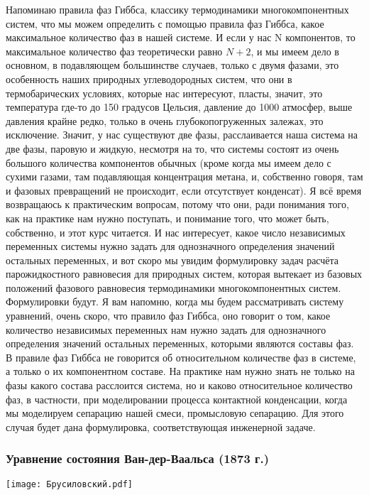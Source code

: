 \documentclass[main.tex]{subfiles}
\begin{document}
Напоминаю правила фаз Гиббса, классику термодинамики многокомпонентных систем, что мы можем определить с помощью правила фаз Гиббса, какое максимальное количество фаз в нашей системе.
И если у нас N компонентов, то максимальное количество фаз теоретически равно $N+2$, и мы имеем дело в основном, в подавляющем большинстве случаев, только с двумя фазами, это особенность наших природных углеводородных систем, что они в термобарических условиях, которые нас интересуют, пласты, значит, это температура где-то до 150 градусов Цельсия, давление до 1000 атмосфер, выше давления крайне редко, только в очень глубокопогруженных залежах, это исключение.
Значит, у нас существуют две фазы, расслаивается наша система на две фазы, паровую и жидкую, несмотря на то, что системы состоят из очень большого количества компонентов обычных (кроме когда мы имеем дело с сухими газами, там подавляющая концентрация метана, и, собственно говоря, там и фазовых превращений не происходит, если отсутствует конденсат).
Я всё время возвращаюсь к практическим вопросам, потому что они, ради понимания того, как на практике нам нужно поступать, и понимание того, что может быть, собственно, и этот курс читается.
И нас интересует, какое число независимых переменных системы нужно задать для однозначного определения значений остальных переменных, и вот скоро мы увидим формулировку задач расчёта парожидкостного равновесия для природных систем, которая вытекает из базовых положений фазового равновесия термодинамики многокомпонентных систем.
Формулировки будут.
Я вам напомню, когда мы будем рассматривать систему уравнений, очень скоро, что правило фаз Гиббса, оно говорит о том, какое количество независимых переменных нам нужно задать для однозначного определения значений остальных переменных, которыми являются составы фаз.
В правиле фаз Гиббса не говорится об относительном количестве фаз в системе, а только о их компонентном составе.
На практике нам нужно знать не только на фазы какого состава расслоится система, но и каково относительное количество фаз, в частности, при моделировании процесса контактной конденсации, когда мы моделируем сепарацию нашей смеси, промысловую сепарацию.
Для этого случая будет дана формулировка, соответствующая инженерной задаче.

\subsubsection{Уравнение состояния Ван-дер-Ваальса (1873 г.)}

\begin{center}
\texttt{[image: Брусиловский.pdf]}
\end{center}
\end{document}
